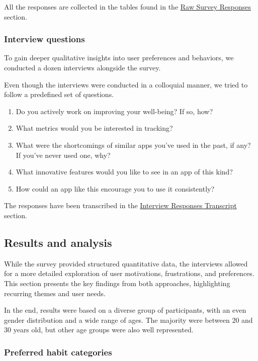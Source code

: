 \documentclass{article}
\begin{document}
All the responses are collected in the tables found in the \hyperref[subsec:survey-responses]{Raw Survey Responses} section.

\subsubsection{Interview questions}

To gain deeper qualitative insights into user preferences and behaviors, we conducted a dozen interviews alongside the survey.

Even though the interviews were conducted in a colloquial manner, we tried to follow a predefined set of questions.

\begin{enumerate}
	\item Do you actively work on improving your well-being? If so, how?
	\item What metrics would you be interested in tracking?
	\item What were the shortcomings of similar apps you’ve used in the past, if any? If you’ve never used one, why?
	\item What innovative features would you like to see in an app of this kind?
	\item How could an app like this encourage you to use it consistently?
\end{enumerate}

The responses have been transcribed in the \hyperref[subsec:interview-responses]{Interview Responses Transcript} section.

\subsection{Results and analysis}

While the survey provided structured quantitative data, the interviews allowed for a more detailed exploration of user motivations, frustrations, and preferences.
This section presents the key findings from both approaches, highlighting recurring themes and user needs.

In the end, results were based on a diverse group of participants, with an even gender distribution and a wide range of ages.
The majority were between 20 and 30 years old, but other age groups were also well represented.

\subsubsection{Preferred habit categories}
\end{document}
